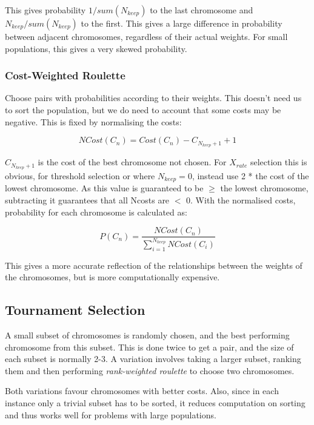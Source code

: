 This gives probability \(1/sum(N_{keep})\) to the last chromosome and \(N_{keep}/sum(N_{keep})\) to the first. This gives a large difference in probability between adjacent chromosomes, regardless of their actual weights. For small populations, this gives a very skewed probability.

\subsubsection{Cost-Weighted Roulette}
Choose pairs with probabilities according to their weights. This doesn't need us to sort the population, but we do need to account that some costs may be negative. This is fixed by normalising the costs:

\begin{equation}
    NCost(C_n) = Cost(C_n) - C_{N_{keep}+1} +1
\end{equation}

 $C_{N_{keep}+1}$ is the cost of the best chromosome not chosen. For $X_{rate}$ selection this is obvious, for threshold selection or where $N_{keep} = 0$, instead use 2 * the cost of the lowest chromosome. As this value is guaranteed to be $\geq$ the lowest chromosome, subtracting it guarantees that all Ncosts are $<$ 0. With the normalised costs, probability for each chromosome is calculated as:
 
\begin{equation}
    P(C_n) = \frac{NCost(C_n)}{\sum_{i=1}^{N_{keep}} NCost(C_i)}
\end{equation} 

This gives a more accurate reflection of the relationships between the weights of the chromosomes, but is more computationally expensive. 

\subsection{Tournament Selection}
A small subset of chromosomes is randomly chosen, and the best performing chromosome from this subset. This is done twice to get a pair, and the size of each subset is normally 2-3. A variation involves taking a larger subset, ranking them and then performing \emph{rank-weighted roulette} to choose two chromosomes.

Both variations favour chromosomes with better costs. Also, since in each instance only a trivial subset has to be sorted, it reduces computation on sorting and thus works well for problems with large populations. 